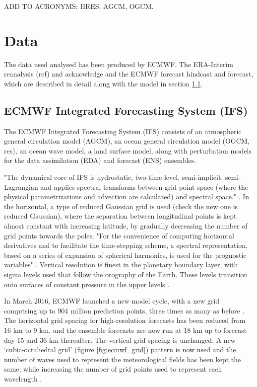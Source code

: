 ADD TO ACRONYMS: HRES, AGCM, OGCM.



\section {Data}  \label{data}

The data used analysed has been produced by ECMWF. The ERA-Interim reanalysis (ref) and acknowledge and the ECMWF forecast hindcast and forecast, which are described in detail along with the model in section \ref{ECMWF_fs}.

\subsection {ECMWF Integrated Forecasting System (IFS)}  \label{ECMWF_fs}

The ECMWF Integrated Forecasting System (IFS) consists of an atmospheric general circulation model (AGCM), an ocean general circulation model (OGCM, res), an ocean wave model, a land surface model, along with perturbation models for the data assimilation (EDA) and forecast (ENS) ensembles.

"The dynamical core of IFS is hydrostatic, two-time-level, semi-implicit, semi-Lagrangian and applies spectral transforms between grid-point space (where the physical parametrizations and advection are calculated) and spectral space." \citep{ecmwf_atm_dyn}. In the horizontal, a type of reduced Gaussian grid is used (check the new one is reduced Gaussian), where the separation between longitudinal points is kept almost constant with increasing latitude, by gradually decreasing the number of grid points towards the poles. "For the convenience of computing horizontal derivatives and to facilitate the time-stepping scheme, a spectral representation, based on a series of expansion of spherical harmonics, is used for the prognostic variables" \citep{ecmwf_user_guide}. Vertical resolution is finest in the planetary boundary layer, with sigma levels used that follow the orography of the Earth. These levels transition onto surfaces of constant pressure in the upper levels \citep{ecmwf_user_guide}.

In March 2016, ECMWF  launched a new model cycle, with a new grid comprising up to 904 million prediction points, three times as many as before \citep{ecmwf_newmodel}.
The horizontal grid spacing for high-resolution forecasts has been reduced from 16 km to 9 km, and the ensemble forecasts are now run at 18 km up to forecast day 15 and 36 km thereafter. The vertical grid spacing is unchanged. A new ‘cubic-octahedral grid’ (figure \ref{fig:ecmwf_grid}) pattern is now used and the number of waves used to represent the meteorological fields has been kept the same, while increasing the number of grid points used to represent each wavelength \citep{ecmwf_newmodel}.

